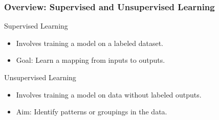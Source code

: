\documentclass[aspectratio=169]{beamer}
\begin{document}
\begin{frame}
    \frametitle{Overview: Supervised and Unsupervised Learning}
    \begin{block}{Supervised Learning}
        \begin{itemize}
            \item Involves training a model on a labeled dataset.
            \item Goal: Learn a mapping from inputs to outputs.
        \end{itemize}
    \end{block}
    
    \begin{block}{Unsupervised Learning}
        \begin{itemize}
            \item Involves training a model on data without labeled outputs.
            \item Aim: Identify patterns or groupings in the data.
        \end{itemize}
    \end{block}
\end{frame}
\end{document}
